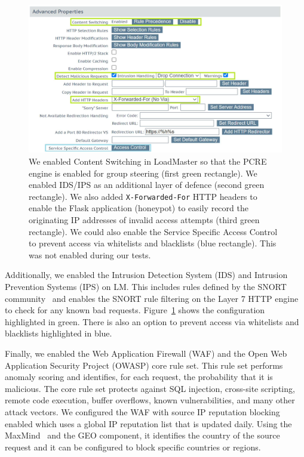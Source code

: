 \begin{figure}
  \centerline{\includegraphics[width=\textwidth]{img/loadmaster-ids-ips}}
  \caption{We enabled Content Switching in LoadMaster so that the PCRE
    engine is enabled for group steering (first green rectangle).  We
    enabled IDS/IPS as an additional layer of defence (second green
    rectangle).  We also added \texttt{X-Forwarded-For} HTTP headers
    to enable the Flask application (honeypot) to easily record the
    originating IP addresses of invalid access attempts (third green
    rectangle).  We could also enable the Service Specific Access
    Control to prevent access via whitelists and blacklists (blue
    rectangle).  This was not enabled during our
    tests.}\label{fig:loadmaster-ids-ips}
\end{figure}

Additionally, we enabled the Intrusion Detection System (IDS) and
Intrusion Prevention Systems (IPS) on LM.  This includes rules defined
by the SNORT community~\cite{cisco-snort-xx} and enables the SNORT
rule filtering on the Layer 7 HTTP engine to check for any known bad
requests.  Figure~\ref{fig:loadmaster-ids-ips} shows the configuration
highlighted in green.  There is also an option to prevent access via
whitelists and blacklists highlighted in blue.

Finally, we enabled the Web Application Firewall (WAF) and the Open
Web Application Security Project (OWASP) core rule set.  This rule set
performs anomaly scoring and identifies, for each request, the
probability that it is malicious.  The core rule set protects against
SQL injection, cross-site scripting, remote code execution, buffer
overflows, known vulnerabilities, and many other attack vectors.  We
configured the WAF with source IP reputation blocking enabled which
uses a global IP reputation list that is updated daily.  Using the
MaxMind~\cite{maxmind-xx} and the GEO component, it identifies the
country of the source request and it can be configured to block
specific countries or regions.


